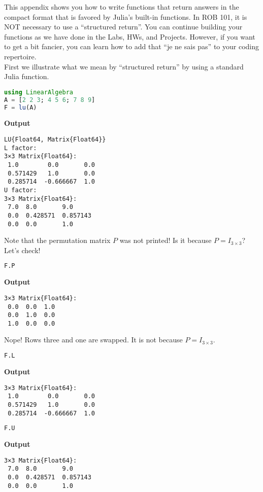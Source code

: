 This appendix shows you how to write functions that return answers in the compact format that is favored by Julia's built-in functions. In ROB 101, it is NOT necessary to use a ``structured return''. You can continue building your functions as we have done in the Labs, HWs, and Projects. However, if you want to get a bit fancier, you can learn how to add that ``je ne sais pas'' to your coding repertoire.\\

First we illustrate what we mean by ``structured return'' by using a standard Julia function. \\


\begin{lstlisting}[language=Julia,style=mystyle]
using LinearAlgebra
A = [2 2 3; 4 5 6; 7 8 9]
F = lu(A)
\end{lstlisting}
\textbf{Output} 
\begin{verbatim}
LU{Float64, Matrix{Float64}}
L factor:
3×3 Matrix{Float64}:
 1.0        0.0       0.0
 0.571429   1.0       0.0
 0.285714  -0.666667  1.0
U factor:
3×3 Matrix{Float64}:
 7.0  8.0       9.0
 0.0  0.428571  0.857143
 0.0  0.0       1.0
\end{verbatim}

Note that the permutation matrix $P$ was not printed! Is it because $P=I_{3 \times 3}$? Let's check!

\begin{lstlisting}[language=Julia,style=mystyle]
F.P
\end{lstlisting}
\textbf{Output} 
\begin{verbatim}
3×3 Matrix{Float64}:
 0.0  0.0  1.0
 0.0  1.0  0.0
 1.0  0.0  0.0
\end{verbatim}

Nope! Rows three and one are swapped. It is not because $P = I_{3 \times 3}$.\\

\begin{lstlisting}[language=Julia,style=mystyle]
F.L
\end{lstlisting}
\textbf{Output} 
\begin{verbatim}
3×3 Matrix{Float64}:
 1.0        0.0       0.0
 0.571429   1.0       0.0
 0.285714  -0.666667  1.0
\end{verbatim}


\begin{lstlisting}[language=Julia,style=mystyle]
F.U
\end{lstlisting}
\textbf{Output} 
\begin{verbatim}
3×3 Matrix{Float64}:
 7.0  8.0       9.0
 0.0  0.428571  0.857143
 0.0  0.0       1.0
\end{verbatim}



